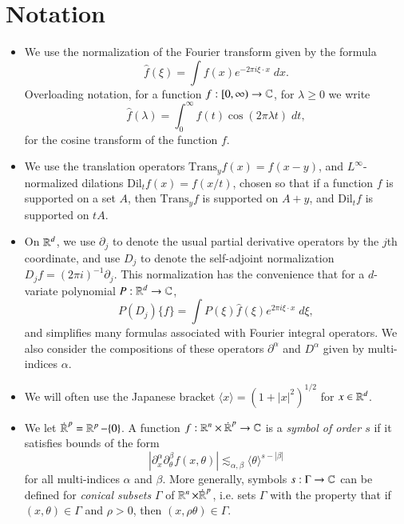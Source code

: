 
\chapter*{Notation}

\begin{itemize}
    \item We use the normalization of the Fourier transform given by the formula
    \[ \widehat{f}(\xi) = \int f(x) e^{- 2 \pi i \xi \cdot x}\; dx. \]
    Overloading notation, for a function $f: [0,\infty) \to \operatorname{\mathbb{C}}$, for $\lambda \geq 0$ we write
    \[ \widehat{f}(\lambda) = \int_0^\infty f(t) \cos(2 \pi \lambda t)\; dt, \]
    for the cosine transform of the function $f$.

    \item We use the translation operators $\text{Trans}_y f(x) = f(x - y)$, and $L^\infty$-normalized dilations $\text{Dil}_t f(x) = f(x/t)$, chosen so that if a function $f$ is supported on a set $A$, then $\text{Trans}_y f$ is supported on $A + y$, and $\text{Dil}_t f$ is supported on $tA$. %

    \item On $\operatorname{\mathbb{R}}^d$, we use $\partial_j$ to denote the usual partial derivative operators by the $j$th coordinate, and use $D_j$ to denote the self-adjoint normalization $D_j f = (2 \pi i)^{-1} \partial_j$. This normalization has the convenience that for a $d$-variate polynomial $P: \operatorname{\mathbb{R}}^d \to \operatorname{\mathbb{C}}$,
    \[ P(D_j) \{ f \} = \int P(\xi) \widehat{f}(\xi) e^{2 \pi i \xi \cdot x}\; d\xi, \]
    and simplifies many formulas associated with Fourier integral operators. We also consider the compositions of these operators $\partial^\alpha$ and $D^\alpha$ given by multi-indices $\alpha$.

    \item We will often use the Japanese bracket $\langle x \rangle = (1 + |x|^2)^{1/2}$ for $x \in \operatorname{\mathbb{R}}^d$.

    \item We let $\dot{\operatorname{\mathbb{R}}}^p = \operatorname{\mathbb{R}}^p - \{ 0 \}$. A function $f: {\operatorname{\mathbb{R}}^n} \times {\dot{\operatorname{\mathbb{R}}}^p} \to \operatorname{\mathbb{C}}$ is a \emph{symbol of order $s$} if it satisfies bounds of the form
    \[ | \partial_x^\alpha \partial_\theta^\beta f (x,\theta) | \lesssim_{\alpha,\beta} \langle \theta \rangle^{s - |\beta|} \]
    for all multi-indices $\alpha$ and $\beta$. More generally, symbols $s: \Gamma \to \operatorname{\mathbb{C}}$ can be defined for \emph{conical subsets} $\Gamma$ of $\operatorname{\mathbb{R}}^n \times \dot{\operatorname{\mathbb{R}}}^p$, i.e. sets $\Gamma$ with the property that if $(x,\theta) \in \Gamma$ and $\rho > 0$, then $(x,\rho \theta) \in \Gamma$.


\end{itemize}
